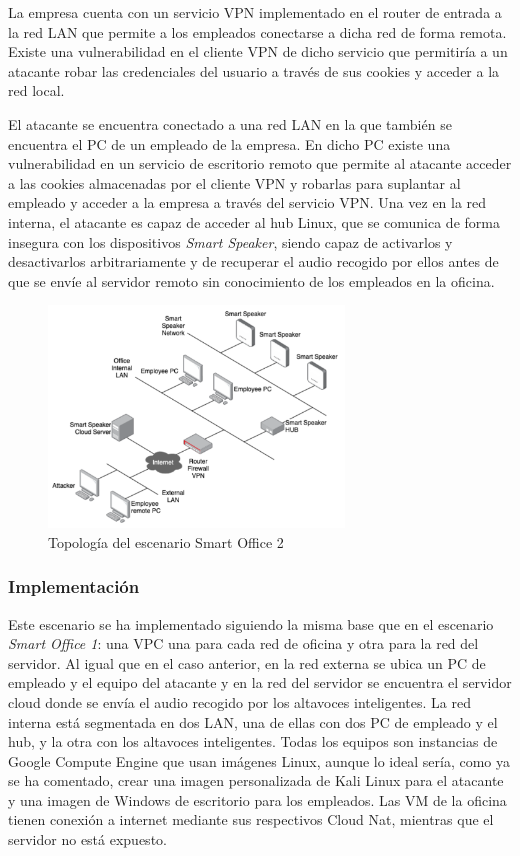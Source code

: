   La empresa cuenta con un servicio VPN implementado en el router de entrada a la red LAN que permite a los empleados conectarse a dicha red de forma remota. Existe una vulnerabilidad en el cliente VPN de dicho servicio que permitiría a un atacante robar las credenciales del usuario a través de sus cookies y acceder a la red local. 

  
  El atacante se encuentra conectado a una red LAN en la que también se encuentra el PC de un empleado de la empresa. En dicho PC existe una vulnerabilidad en un servicio de escritorio remoto que permite al atacante acceder a las cookies almacenadas por el cliente VPN y robarlas para suplantar al empleado y acceder a la empresa a través del servicio VPN. Una vez en la red interna, el atacante es capaz de acceder al hub Linux, que se comunica de forma insegura con los dispositivos \textit{Smart Speaker}, siendo capaz de activarlos y desactivarlos arbitrariamente y de recuperar el audio recogido por ellos antes de que se envíe al servidor remoto sin conocimiento de los empleados en la oficina. \\ 

  \begin{figure}[h]
  \centering
  \includegraphics[width=0.7\textwidth]{../imgs/desarrollo/escenarios-de-red/smart-office-2/smart-office-2.png}
  \caption{Topología del escenario Smart Office 2}
  \label{fig:so2-t}
  \end{figure}

\subsubsection{Implementación}
  Este escenario se ha implementado siguiendo la misma base que en el escenario \textit{Smart Office 1}: una VPC una para cada red de oficina  y otra para la red del servidor. Al igual que en el caso anterior, en la red externa se ubica un PC de empleado y el equipo del atacante y en la red del servidor se encuentra el servidor cloud donde se envía el audio recogido por los altavoces inteligentes. La red interna está segmentada en dos LAN, una de ellas con dos PC de empleado y el hub, y la otra con los altavoces inteligentes. Todas los equipos son instancias de Google Compute Engine que usan imágenes Linux, aunque lo ideal sería, como ya se ha comentado, crear una imagen personalizada de Kali Linux para el atacante y una imagen de Windows de escritorio para los empleados. Las VM de la oficina tienen conexión a internet mediante sus respectivos Cloud Nat, mientras que el servidor no está expuesto.

